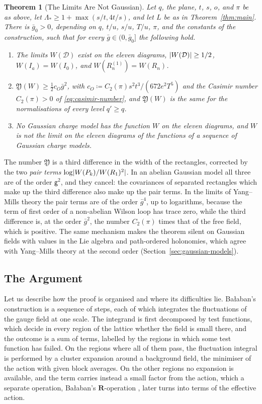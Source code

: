 \documentclass[11pt]{preprint}
\DeclarePairedDelimiter{\abs}{\lvert}{\rvert}
\numberwithin{equation}{section}
\newtheorem{theorem}{Theorem}[section]
\theoremstyle{definition}
\theoremstyle{remark}
\theoremstyle{plain}
\begin{document}
\begin{theorem}[The Limits Are Not Gaussian]\label{thm:non-gaussian}
Let $q$, the plane, $t$, $s$, $o$, and $\pi$ be as above, let $\Lambda_* \geq 1 + \max(s/t, 4t/s)$, and let $L$ be as in Theorem~\ref{thm:main}. There is $\bar g_0 > 0$, depending on $q$, $t/u$, $s/u$, $T/u$, $\pi$, and the constants of the construction, such that for every $\bar g \in (0, \bar g_0]$ the following hold.
\begin{enumerate}[label=(\roman*)]
\item The limits $W(\mathcal D)$ exist on the eleven diagrams, $\abs{W(\mathcal D)} \geq 1/2$, $W(I_a) = W(I_0)$, and $W(R^{(1)}_n) = W(R_n)$.
\item $\mathfrak Y(W) \geq \frac12c_O\bar g^2$, with $c_O \coloneqq C_2(\pi)s^2t^3/(672e^2T^5)$ and the Casimir number $C_2(\pi) > 0$ of \eqref{eq:casimir-number}, and $\mathfrak Y(W)$ is the same for the normalisations of every level $q' \geq q$.
\item No Gaussian charge model has the function $W$ on the eleven diagrams, and $W$ is not the limit on the eleven diagrams of the functions of a sequence of Gaussian charge models.
\end{enumerate}
\end{theorem}

The number $\mathfrak Y$ is a third difference in the width of the rectangles, corrected by the two \emph{pair terms} $\log\abs{W(P_k)/W(R_1)^2}$. In an abelian Gaussian model all three are of the order $\mathsf g^2$, and they cancel: the covariances of separated rectangles which make up the third difference also make up the pair terms. In the limits of Yang--Mills theory the pair terms are of the order $\bar g^4$, up to logarithms, because the term of first order of a non-abelian Wilson loop has trace zero, while the third difference is, at the order $\bar g^2$, the number $C_2(\pi)$ times that of the free field, which is positive. The same mechanism makes the theorem silent on Gaussian fields with values in the Lie algebra and path-ordered holonomies, which agree with Yang--Mills theory at the second order (Section~\ref{sec:gaussian-models}).

\subsection{The Argument}\label{sec:argument}

Let us describe how the proof is organised and where its difficulties lie. Ba{\l}aban's construction is a sequence of steps, each of which integrates the fluctuations of the gauge field at one scale. The integrand is first decomposed by test functions, which decide in every region of the lattice whether the field is small there, and the outcome is a sum of terms, labelled by the regions in which some test function has failed. On the regions where all of them pass, the fluctuation integral is performed by a cluster expansion around a background field, the minimiser of the action with given block averages. On the other regions no expansion is available, and the term carries instead a small factor from the action, which a separate operation, Ba{\l}aban's $\mathbf R$-operation \cite{BalabanLFR1,BalabanLFR2}, later turns into terms of the effective action.
\end{document}
